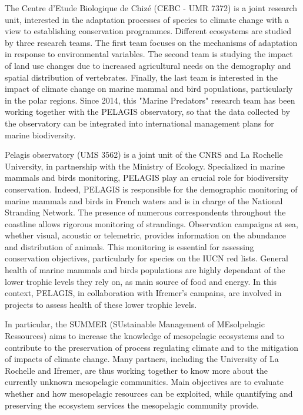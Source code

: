 
The Centre d'Etude Biologique de Chizé (CEBC - UMR 7372) is a joint research unit, interested in the adaptation processes of species to climate change with a view to establishing conservation programmes. Different ecosystems are studied by three research teams. The first team focuses on the mechanisms of adaptation in response to environmental variables. The second team is studying the impact of land use changes due to increased agricultural needs on the demography and spatial distribution of vertebrates. Finally, the last team is interested in the impact of climate change on marine mammal and bird populations, particularly in the polar regions. Since 2014, this "Marine Predators" research team has been working together with the PELAGIS observatory, so that the data collected by the observatory can be integrated into international management plans for marine biodiversity.  

Pelagis observatory (UMS 3562) is a joint unit of the CNRS and La Rochelle University, in partnership with the Ministry of Ecology. Specialized in marine mammals and birds monitoring, PELAGIS play an crucial role for biodiversity conservation. Indeed, PELAGIS is responsible for the demographic monitoring of marine mammals and birds in French waters and is in charge of the National Stranding Network. The presence of numerous correspondents throughout the coastline allows rigorous monitoring of strandings. Observation campaigns at sea, whether visual, acoustic or telemetric, provides information on the abundance and distribution of animals. This monitoring is essential for assessing conservation objectives, particularly for species on the IUCN red lists. General health of marine mammals and birds populations are highly dependant of the lower trophic levels they rely on, as main source of food and energy. In this context, PELAGIS, in collaboration with Ifremer's campains, are involved in projects to assess health of these lower trophic levels. 

In particular, the SUMMER (SUstainable Management of MEsolpelagic Ressources) aims to increase the knowledge of mesopelagic ecosystems and to contribute to the preservation of process regulating climate and to the mitigation of impacts of climate change. Many partners, including the University of La Rochelle and Ifremer, are thus working together to know more about the currently unknown mesopelagic communities. Main objectives are to evaluate whether and how mesopelagic resources can be exploited, while quantifying and preserving the ecosystem services the mesopelagic community provide.